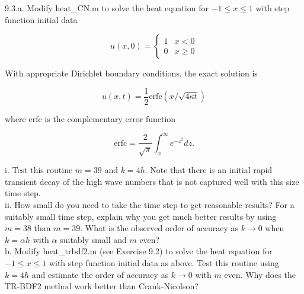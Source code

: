 9.3.a. Modify heat\_CN.m to solve the heat equation for $-1\leq x\leq1$ with step function initial data

$$u(x,0)=\left \{ \begin{array}{cc} 1 & x < 0 \\ 0 & x\geq 0 \end{array} \right.$$

With appropriate Dirichlet boundary conditions, the exact solution is

$$u(x,t)=\frac12\text{erfc}(x/\sqrt{4\kappa t})$$

where erfc is the complementary error function

$$\text{erfc}=\frac{2}{\sqrt{\pi}}\int_x^{\infty}e^{-z^2}dz.$$

i. Test this routine $m=39$ and $k=4h$. Note that there is an initial rapid transient decay of the high
wave numbers that is not captured well with this size time step.\\
ii. How small do you need to take the time step to get reasonable results? For a suitably small time
step, explain why you get much better results by using $m=38$ than $m=39$. What is the observed order of
accuracy as $k\rightarrow 0$ when $k=\alpha h$ with $\alpha$ suitably small and $m$ even?\\
b. Modify heat\_trbdf2.m (see Exercise 9.2) to solve the heat equation for $-1\leq x\leq1$ with step
function initial data as above. Test this routine using $k=4h$ and estimate the order of accuracy as
$k\rightarrow0$ with $m$ even. Why does the TR-BDF2 method work better than Crank-Nicolson?\\

